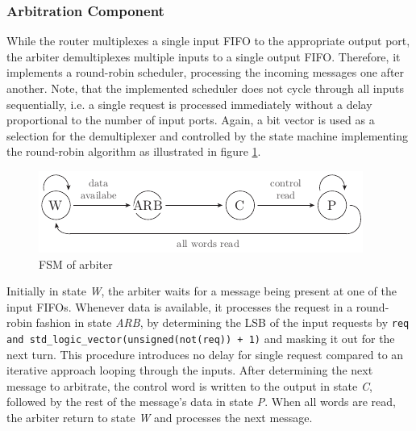 \subsubsection{Arbitration Component}
While the router multiplexes a single input \ac{FIFO} to the appropriate
output port, the arbiter demultiplexes multiple inputs to a single output
\ac{FIFO}. Therefore, it implements a round-robin scheduler, processing the
incoming messages one after another. Note, that the implemented scheduler does
not cycle through all inputs sequentially, i.e. a single request is processed
immediately without a delay proportional to the number of input ports. Again,
a bit vector is used as a selection for the demultiplexer and controlled by
the state machine implementing the round-robin algorithm as illustrated in
figure \ref{fig:arbiter_fsm}.
\begin{figure}[tb]
	\centering
	\includegraphics{../figures/arbiter_fsm}
	\caption{\acs{FSM} of arbiter}
	\label{fig:arbiter_fsm}
\end{figure}
Initially in state \emph{W}, the arbiter waits for a message being present at
one of the input \acp{FIFO}. Whenever data is available, it processes the
request in a round-robin fashion in state \emph{ARB}, by determining the
\ac{LSB} of the input requests by
\lstinline{req and std_logic_vector(unsigned(not(req)) + 1)} and masking it
out for the next turn. This procedure introduces no delay for single request
compared to an iterative approach looping through the inputs. After
determining the next message to arbitrate, the control word is written to the
output in state \emph{C}, followed by the rest of the message's data in state
\emph{P}. When all words are read, the arbiter return to state \emph{W} and
processes the next message.

